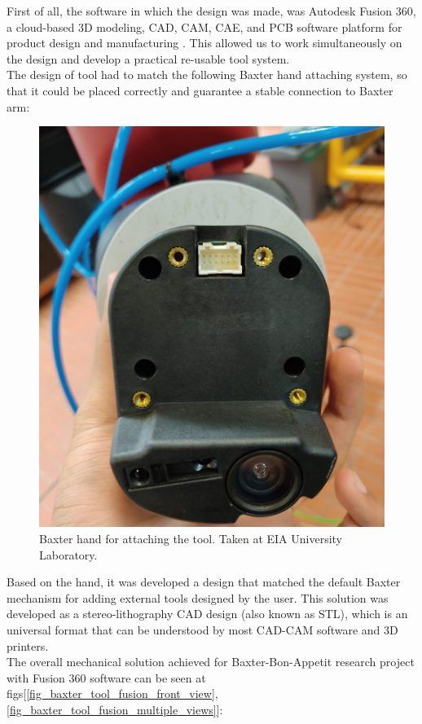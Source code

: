 \documentclass[11pt]{report} %
\begin{document}
First of all, the software in which the design was made, was Autodesk Fusion 360, a cloud-based 3D modeling, CAD, CAM, CAE, and PCB software platform for product design and manufacturing \citep{cite_autodesk_fusion}. This allowed us to work simultaneously on the design and develop a practical re-usable tool system.\\

The design of tool had to match the following Baxter hand attaching system, so that it could be placed correctly and guarantee a stable connection to Baxter arm:

\begin{figure}[H]
    \centering
    \includegraphics[width=0.6\linewidth]{assets/imgs/baxter_robot/baxter_hand_before_tool.jpeg}
    \caption{Baxter hand for attaching the tool. Taken at EIA University Laboratory.} 
    \label{fig_baxter_hand_for_attaching_the_tool}
\end{figure}

Based on the hand, it was developed a design that matched the default Baxter mechanism for adding external tools designed by the user. This solution was developed as a stereo-lithography CAD design (also known as STL), which is an universal format that can be understood by most CAD-CAM software and 3D printers.\\

The overall mechanical solution achieved for Baxter-Bon-Appetit research project with Fusion 360 software can be seen at figs[\ref{fig_baxter_tool_fusion_front_view}, \ref{fig_baxter_tool_fusion_multiple_views}]:
\end{document}
